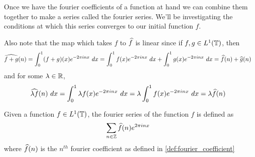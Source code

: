   Once we have the fourier coefficients of a function at hand we can combine them together to make a series called the fourier series. We'll be investigating the conditions at which this series converges to our initial function $f$.

  Also note that the map which takes $f$ to $\widehat{f}$ is linear since if $f, g \in L^1(\mathbb T)$, then $$\widehat{f+g}(n) = \int_0^1 (f+g)(x) e^{-2 \pi inx} \ dx = \int_0^1f(x)e^{-2\pi inx} \ dx + \int_0^1g(x)e^{-2\pi inx} \ dx = \hatf(n) + \hatg(n)$$ and for some $\lambda \in \mathbb R$, $$\widehat{\lambda f}(n) \ dx = \int_0^1 \lambda f(x) e^{-2\pi inx} \ dx = \lambda \int_0^1 f(x) e^{-2 \pi inx} \ dx = \lambda\widehat{f}(n)$$

  \begin{definition}
    \label{def:fourier_series}
    Given a function $f \in L^1(\mathbb T)$, the fourier series of the function $f$ is defined as 
    \begin{displaymath}
      \sum_{n\in \mathbb Z} \widehat{f}(n)e^{2\pi inx}
    \end{displaymath}
    where $\widehat{f}(n)$ is the $n^{th}$ fourier coefficient as defined in \ref{def:fourier_coefficient} 
  \end{definition}

